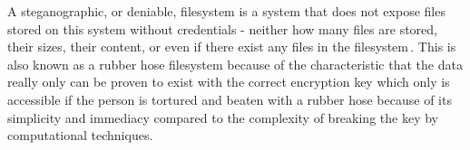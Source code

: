 A steganographic, or deniable, filesystem is a system that does not expose files stored on this system without credentials - neither how many files are stored, their sizes, their content, or even if there exist any files in the filesystem\,\cite{andersonSteganographicFileSystem1998}. This is also known as a rubber hose filesystem because of the characteristic that the data really only can be proven to exist with the correct encryption key which only is accessible if the person is tortured and beaten with a rubber hose because of its simplicity and immediacy compared to the complexity of breaking the key by computational techniques.

